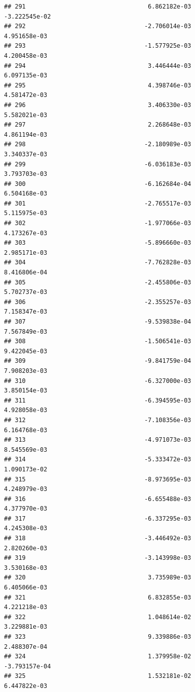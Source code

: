 \documentclass[
]{article}
\begin{document}
\begin{verbatim}
## 291                                  6.862182e-03          -3.222545e-02
## 292                                 -2.706014e-03           4.951658e-03
## 293                                 -1.577925e-03           4.200458e-03
## 294                                  3.446444e-03           6.097135e-03
## 295                                  4.398746e-03           4.581472e-03
## 296                                  3.406330e-03           5.582021e-03
## 297                                  2.268648e-03           4.861194e-03
## 298                                 -2.180989e-03           3.340337e-03
## 299                                 -6.036183e-03           3.793703e-03
## 300                                 -6.162684e-04           6.504168e-03
## 301                                 -2.765517e-03           5.115975e-03
## 302                                 -1.977066e-03           4.173267e-03
## 303                                 -5.896660e-03           2.985171e-03
## 304                                 -7.762828e-03           8.416806e-04
## 305                                 -2.455806e-03           5.702737e-03
## 306                                 -2.355257e-03           7.158347e-03
## 307                                 -9.539838e-04           7.567849e-03
## 308                                 -1.506541e-03           9.422045e-03
## 309                                 -9.841759e-04           7.908203e-03
## 310                                 -6.327000e-03           3.850154e-03
## 311                                 -6.394595e-03           4.928058e-03
## 312                                 -7.108356e-03           6.164768e-03
## 313                                 -4.971073e-03           8.545569e-03
## 314                                 -5.333472e-03           1.090173e-02
## 315                                 -8.973695e-03           4.248979e-03
## 316                                 -6.655488e-03           4.377970e-03
## 317                                 -6.337295e-03           4.245308e-03
## 318                                 -3.446492e-03           2.820260e-03
## 319                                 -3.143998e-03           3.530168e-03
## 320                                  3.735989e-03           6.405066e-03
## 321                                  6.832855e-03           4.221218e-03
## 322                                  1.048614e-02           3.229881e-03
## 323                                  9.339886e-03           2.488307e-04
## 324                                  1.379958e-02          -3.793157e-04
## 325                                  1.532181e-02           6.447822e-03

\end{verbatim}
\end{document}

